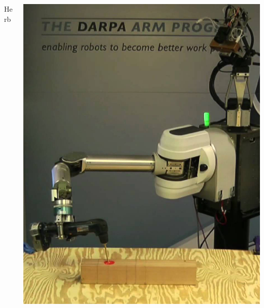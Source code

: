 \documentclass[serif]{beamer}
\begin{document}
\begin{frame}
\begin{columns}
\begin{column}{0.33\textwidth}
\begin{center}
      Herb
   \end{center}
   \end{column}%
   \begin{column}{0.33\textwidth}
   \begin{center}
      \includegraphics[width=\columnwidth]{images/arms.jpg}
      

\end{center}
\end{column}
\end{columns}
\end{frame}
\end{document}
